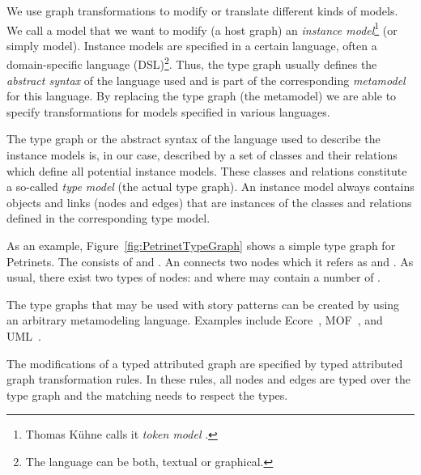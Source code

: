 We use graph transformations to modify or translate different kinds of models.
We call a model that we want to modify (a host graph) an \emph{instance model}\footnote{Thomas K\"{u}hne calls it \emph{token model} \cite{Kue06}.} (or simply model).
Instance models are specified in a certain language, often a domain-specific language (DSL)\footnote{The language can be both, textual or graphical.}.
Thus, the type graph usually defines the \emph{abstract syntax} of the language used and is part of the corresponding \emph{metamodel} \cite{Kue06} for this language.
By replacing the type graph (the metamodel) we are able to specify transformations for models specified in various languages.

The type graph or the abstract syntax of the language used to describe the instance models
is, in our case, described by a set of classes and their relations which define all potential instance models.
These classes and relations constitute a so-called \emph{type model} (the actual type graph).
An instance model always contains objects and links (nodes and edges) that are instances of the classes and relations defined in the corresponding type model.


As an example, Figure~\ref{fig:PetrinetTypeGraph} shows a simple type graph for Petrinets.
The  consists of  and .
An  connects two nodes which it refers as  and .
As usual, there exist two types of nodes:  and  where  may contain a number of .

The type graphs that may be used with story patterns can be created by using an arbitrary metamodeling language.
Examples include Ecore~\cite{SBP+08}, MOF~\cite{MOF05}, and UML~\cite{UML23}.

The modifications of a typed attributed graph are specified by typed attributed graph transformation rules.
In these rules, all nodes and edges are typed over the type graph  and the matching needs to respect the types.

